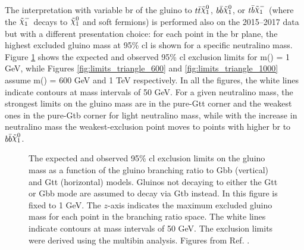 The interpretation with variable \gls{br} of the gluino to $ t \bar{t} \ninoone$, $ b \bar{b} \ninoone$, 
or $t \bar{b} \chinoonem$ (where the $\chinoonem$ decays to $\ninoone$ and soft fermions) 
is performed also on the 2015--2017 data but with a different 
presentation choice: for each point in the \gls{br} plane, the highest excluded gluino mass at 95\% \gls{cl}
is shown for a specific neutralino mass. 
Figure \ref{fig:limits_triangle_1} shows the expected and observed 95\%
\gls{cl} exclusion limits for m(\ninoone) = 1 GeV, while Figures \ref{fig:limits_triangle_600} and \ref{fig:limits_triangle_1000} assume 
m(\ninoone) = 600 GeV and 1 TeV respectively. 
In all the figures, the white lines indicate contours at mass intervals of 50 GeV. 
For a given neutralino mass, the strongest limits on the gluino mass are in the pure-Gtt corner and the weakest ones in the 
pure-Gtb corner for light neutralino mass, while with the increase in neutralino mass the weakest-exclusion point 
moves to points with higher \gls{br} to $ b \bar{b} \ninoone$.


\begin{figure}[htbp]
  \centering 
  \caption{The   expected and  observed 95\% \gls{cl} exclusion limits on the gluino mass as a function of the gluino branching ratio to Gbb (vertical) and Gtt (horizontal) models. Gluinos not decaying to either the Gtt or Gbb mode are assumed to decay via Gtb instead. In this figure \mchi is fixed to 1 GeV. The $z$-axis indicates the maximum excluded gluino mass for each point in the branching ratio space. The white lines indicate contours at mass intervals of 50 GeV. The exclusion limits were derived using the multibin analysis.
  Figures from Ref. \cite{ATLAS-CONF-2018-041}.}
  \label{fig:limits_triangle_1}
\end{figure}

